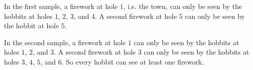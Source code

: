 \remainingsamples

In the first sample, a firework at hole $1$, i.e. the town, can only be seen by
the hobbits at holes $1$, $2$, $3$, and $4$. A second firework at hole $5$ can
only be seen by the hobbit at hole $5$.

In the second sample, a firework at hole $1$ can only be seen by the hobbits at
holes $1$, $2$, and $3$. A second firework at hole $3$ can only be seen by the
hobbits at holes $3$, $4$, $5$, and $6$. So every hobbit can see at least one
firework.